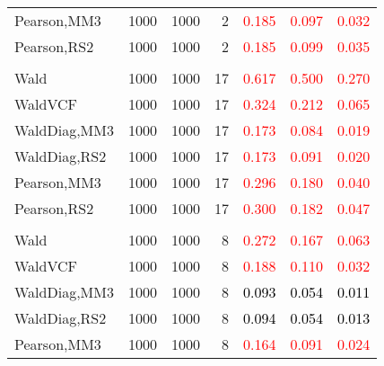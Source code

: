 \documentclass[
]{article}
\begin{document}
\begin{table}[H]
{\begin{tabular}[t]{lrrrrrr}
\hspace{1em}Pearson,MM3 & 1000 & 1000 & 2 & \textcolor{red}{0.185} & \textcolor{red}{0.097} & \textcolor{red}{0.032}\\
\hspace{1em}Pearson,RS2 & 1000 & 1000 & 2 & \textcolor{red}{0.185} & \textcolor{red}{0.099} & \textcolor{red}{0.035}\\
\addlinespace[0.3em]
\multicolumn{7}{l}{\textbf{1F 15V}}\\
\hspace{1em}Wald & 1000 & 1000 & 17 & \textcolor{red}{0.617} & \textcolor{red}{0.500} & \textcolor{red}{0.270}\\
\hspace{1em}WaldVCF & 1000 & 1000 & 17 & \textcolor{red}{0.324} & \textcolor{red}{0.212} & \textcolor{red}{0.065}\\
\hspace{1em}WaldDiag,MM3 & 1000 & 1000 & 17 & \textcolor{red}{0.173} & \textcolor{red}{0.084} & \textcolor{red}{0.019}\\
\hspace{1em}WaldDiag,RS2 & 1000 & 1000 & 17 & \textcolor{red}{0.173} & \textcolor{red}{0.091} & \textcolor{red}{0.020}\\
\hspace{1em}Pearson,MM3 & 1000 & 1000 & 17 & \textcolor{red}{0.296} & \textcolor{red}{0.180} & \textcolor{red}{0.040}\\
\hspace{1em}Pearson,RS2 & 1000 & 1000 & 17 & \textcolor{red}{0.300} & \textcolor{red}{0.182} & \textcolor{red}{0.047}\\
\addlinespace[0.3em]
\multicolumn{7}{l}{\textbf{2F 10V}}\\
\hspace{1em}Wald & 1000 & 1000 & 8 & \textcolor{red}{0.272} & \textcolor{red}{0.167} & \textcolor{red}{0.063}\\
\hspace{1em}WaldVCF & 1000 & 1000 & 8 & \textcolor{red}{0.188} & \textcolor{red}{0.110} & \textcolor{red}{0.032}\\
\hspace{1em}WaldDiag,MM3 & 1000 & 1000 & 8 & \textcolor{black}{0.093} & \textcolor{black}{0.054} & \textcolor{black}{0.011}\\
\hspace{1em}WaldDiag,RS2 & 1000 & 1000 & 8 & \textcolor{black}{0.094} & \textcolor{black}{0.054} & \textcolor{black}{0.013}\\
\hspace{1em}Pearson,MM3 & 1000 & 1000 & 8 & \textcolor{red}{0.164} & \textcolor{red}{0.091} & \textcolor{red}{0.024}\\

\end{tabular}}
\end{table}
\end{document}
